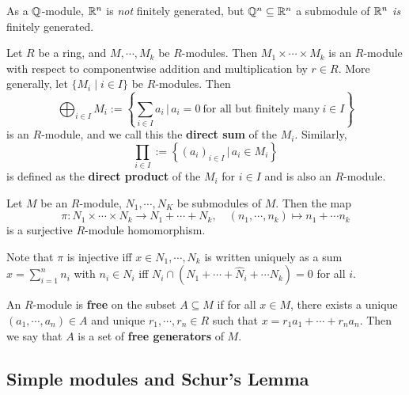 \begin{example}
    As a $\mathbb{Q}$-module, $\mathbb{R}^n $ is \emph{not} finitely generated, but $\mathbb{Q}^n \subseteq \mathbb{R}^n $ a submodule of $\mathbb{R}^n $ \emph{is} finitely generated.
\end{example}
\begin{definition}
    Let $R$ be a ring, and $M,\cdots ,M_k$ be $R$-modules. Then $M_1\times \cdots \times M_k$ is an $R$-module with respect to componentwise addition and multiplication by $r\in R$. More generally, let $\{M_i  \mid i \in I\} $ be $R$-modules. Then \[
        \bigoplus_{i\in I}M_i :=\left\{\sum_{i\in I}^{} a_i  \,\big|\,a_i =0 \ \text{for all but finitely many} \ i \in I\right\} 
    \] is an $R$-module, and we call this the \textbf{direct sum}  of the $M_i $. Similarly,  \[
    \prod _{i\in I}:= \left\{ {(a_i )}_{i\in I}\, \big|\, a_i \in M_i \right\} 
    \] is defined as the \textbf{direct product} of the $M_i $ for $i\in I$ and is also an $R$-module.
\end{definition}
\begin{prop}
    Let $M$ be an $R$-module, $N_1,\cdots ,N_K$ be submodules of $M$. Then the map \[
        \pi \colon N_1\times \cdots \times N_k \to N_1+\cdots +N_k,\quad (n_1,\cdots ,n_k)\mapsto n_1+\cdots n_k
    \] is a surjective $R$-module homomorphism.
\end{prop}
\begin{note}
    Note that $\pi$ is injective iff $x\in N_1,\cdots ,N_k$ is written uniquely as a sum $x=\sum_{i=1}^{n} n_i $ with $n_i \in N_i $ iff $N_i \cap (N_1+\cdots + \hat{N}_i +\cdots N_k)=0$ for all $i$.
\end{note}
\begin{definition}
    An $R$-module is \textbf{free} on the subset $A\subseteq M$ if for all $x\in M$, there exists a unique $(a_1,\cdots ,a_n )\in A$ and unique $r_1,\cdots ,r_n \in R$ such that $x=r_1a_1+\cdots +r_n a_n $. Then we say that $A$ is a set of \textbf{free generators} of $M$.
\end{definition}
\subsection{Simple modules and Schur's Lemma}

